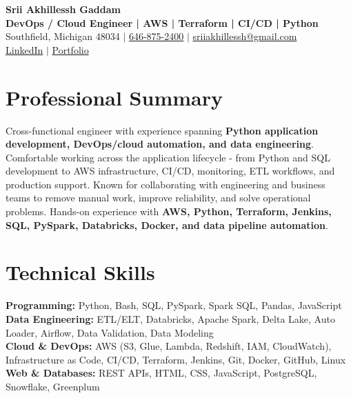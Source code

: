 \documentclass[letterpaper,10pt]{article}
\begin{document}
\fontsize{9.35pt}{10.45pt}\selectfont

\begin{center}
    {\LARGE \textbf{Srii Akhillessh Gaddam}} \\[-1pt]
    \textbf{DevOps / Cloud Engineer | AWS | Terraform | CI/CD | Python} \\[2pt]
    Southfield, Michigan 48034 $|$
    \href{tel:6468752400}{646-875-2400} $|$
    \href{mailto:sriiakhillessh@gmail.com}{sriiakhillessh@gmail.com} \\[1pt]
    \href{https://www.linkedin.com/in/srii-akhiilessh-gaddam-b48668191/}{LinkedIn} $|$
    \href{https://sriiakhillesshg.github.io/portfolio/}{Portfolio}
\end{center}
\vspace{-8pt}

\section{Professional Summary}
\small{Cross-functional engineer with experience spanning \textbf{Python application development, DevOps/cloud automation, and data engineering}. Comfortable working across the application lifecycle - from Python and SQL development to AWS infrastructure, CI/CD, monitoring, ETL workflows, and production support. Known for collaborating with engineering and business teams to remove manual work, improve reliability, and solve operational problems. Hands-on experience with \textbf{AWS, Python, Terraform, Jenkins, SQL, PySpark, Databricks, Docker, and data pipeline automation}.}

\section{Technical Skills}
\small{
\textbf{Programming:} Python, Bash, SQL, PySpark, Spark SQL, Pandas, JavaScript \\
\textbf{Data Engineering:} ETL/ELT, Databricks, Apache Spark, Delta Lake, Auto Loader, Airflow, Data Validation, Data Modeling \\
\textbf{Cloud \& DevOps:} AWS (S3, Glue, Lambda, Redshift, IAM, CloudWatch), Infrastructure as Code, CI/CD, Terraform, Jenkins, Git, Docker, GitHub, Linux \\
\textbf{Web \& Databases:} REST APIs, HTML, CSS, JavaScript, PostgreSQL, Snowflake, Greenplum
}
\end{document}
